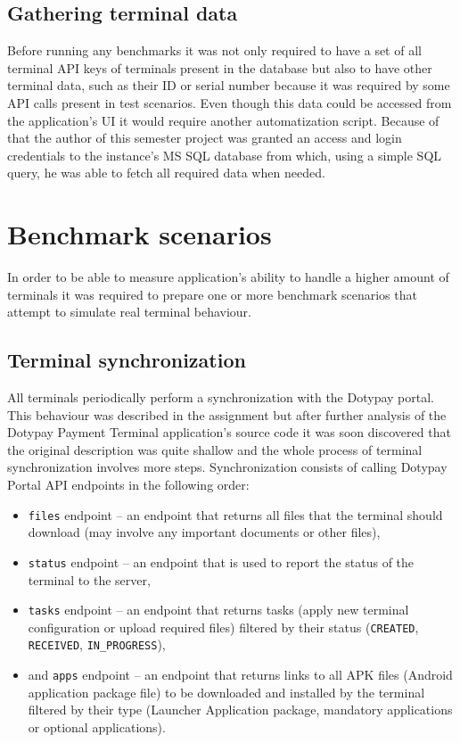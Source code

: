 \documentclass[12pt, a4paper]{article}
\let\oldsection\section
\renewcommand\section{\clearpage\oldsection}
\begin{document}
\subsection{Gathering terminal data}

Before running any benchmarks it was not only required to have a set of all terminal API keys of terminals present in the database but also to have other terminal data, such as their ID or serial number because it was required by some API calls present in test scenarios.
Even though this data could be accessed from the application's UI it would require another automatization script.
Because of that the author of this semester project was granted an access and login credentials to the instance's MS SQL database from which, using a simple SQL query, he was able to fetch all required data when needed.


\section{Benchmark scenarios}

In order to be able to measure application's ability to handle a higher amount of terminals it was required to prepare one or more benchmark scenarios that attempt to simulate real terminal behaviour.


\subsection{Terminal synchronization}
All terminals periodically perform a synchronization with the Dotypay portal.
This behaviour was described in the assignment but after further analysis of the Dotypay Payment Terminal application's source code it was soon discovered that the original description was quite shallow and the whole process of terminal synchronization involves more steps.
Synchronization consists of calling Dotypay Portal API endpoints in the following order:

\begin{itemize}
    \item \texttt{files} endpoint -- an endpoint that returns all files that the terminal should download (may involve any important documents or other files),
    \item \texttt{status} endpoint -- an endpoint that is used to report the status of the terminal to the server,
    \item \texttt{tasks} endpoint -- an endpoint that returns tasks (apply new terminal configuration or upload required files) filtered by their status (\texttt{CREATED}, \texttt{RECEIVED}, \texttt{IN\_PROGRESS}),
    \item and \texttt{apps} endpoint -- an endpoint that returns links to all APK files (Android application package file) to be downloaded and installed by the terminal filtered by their type (Launcher Application package, mandatory applications or optional applications).
\end{itemize}
\end{document}
